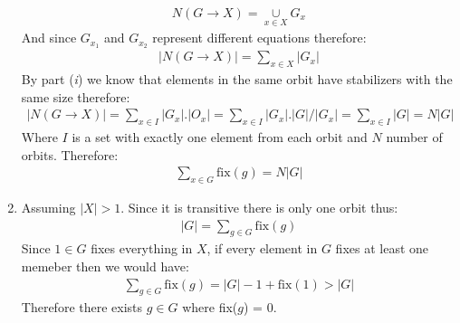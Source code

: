 \begin{enumerate}[label=\ilabel]
        \begin{gather*}
            N(G \to X) = \underset{x \in X    }{\cup} G_x
        \end{gather*}
        And since $G_{x_1}$ and $G_{x_2}$ represent different equations therefore:
        \begin{gather*}
            |N(G \to X)| = \underset{x \in X   }{\sum } |G_x|
        \end{gather*} 
        By part (\textit{i}) we know that elements in the same orbit have stabilizers with the same size therefore:
        \begin{gather*}
            |N(G \to X)| = \underset{x \in I }{\sum } |G_x|.|O_x| = \underset{x \in I }{\sum }|G_x|.|G|/|G_x| = \underset{x \in I }{\sum }|G| = N |G|
        \end{gather*}
        Where $I$ is a set with exactly one element from each orbit and $N$ number of orbits.
        Therefore:
        \begin{gather*}
            \underset{x \in G }{\sum}\text{fix}(g) = N |G|
        \end{gather*}
    \item 
        Assuming $|X| > 1$. Since it is transitive there is only one orbit thus:
        \begin{gather*}
            |G|= \underset{g \in G }{\sum} \text{fix}(g)
        \end{gather*}
        Since $1 \in G$ fixes everything in $X$, if every element in $G$ fixes at least one memeber then we would have:
        \begin{gather*}
            \underset{g \in G }{\sum} \text{fix}(g) = |G| - 1 + \text{fix}(1) > |G|
        \end{gather*}
        Therefore there exists $g \in G$ where fix($g$) = 0.
\end{enumerate}